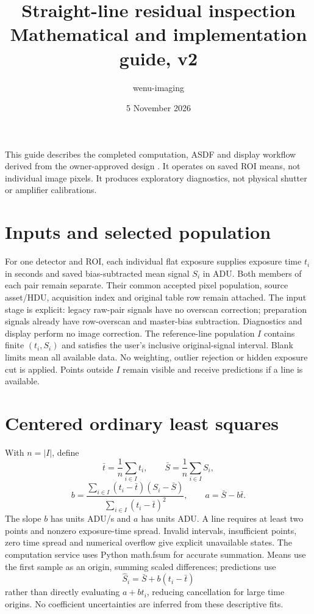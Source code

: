 \documentclass[10pt,a4paper]{article}
\title{Straight-line residual inspection\\Mathematical and implementation guide, v2}
\author{wenu-imaging}
\date{5 November 2026}
\begin{document}
\maketitle
\noindent This guide describes the completed computation, ASDF and display workflow derived from the
owner-approved design .
It operates on saved ROI means, not individual image pixels. It produces
exploratory diagnostics, not physical shutter or amplifier calibrations.

\section{Inputs and selected population}
For one detector and ROI, each individual flat exposure supplies exposure time
$t_i$ in seconds and saved bias-subtracted mean signal $S_i$ in ADU. Both members
of each pair remain separate. Their common accepted pixel population, source
asset/HDU, acquisition index and original table row remain attached.
The input stage is explicit: legacy raw-pair signals have no overscan
correction; preparation signals already have row-overscan and master-bias
subtraction. Diagnostics and display perform no image correction.
The reference-line population $I$ contains finite $(t_i,S_i)$ and satisfies the
user's inclusive original-signal interval. Blank limits mean all available data.
No weighting, outlier rejection or hidden exposure cut is applied. Points outside
$I$ remain visible and receive predictions if a line is available.

\section{Centered ordinary least squares}
With $n=|I|$, define
\[
 \bar t=\frac1n\sum_{i\in I}t_i,\qquad
 \bar S=\frac1n\sum_{i\in I}S_i,
\]
\[
 b=\frac{\sum_{i\in I}(t_i-\bar t)(S_i-\bar S)}
          {\sum_{i\in I}(t_i-\bar t)^2},\qquad
 a=\bar S-b\bar t.
\]
The slope $b$ has units ADU/s and $a$ has units ADU. A line requires at least two
points and nonzero exposure-time spread. Invalid intervals, insufficient points,
zero time spread and numerical overflow give explicit unavailable states.
The computation service uses Python math.fsum for accurate summation. Means use the first sample as an
origin, summing scaled differences; predictions use
\[
 \widehat S_i=\bar S+b(t_i-\bar t)
\]
rather than directly evaluating $a+bt_i$, reducing cancellation for large time
origins. No coefficient uncertainties are inferred from these descriptive fits.
\end{document}
